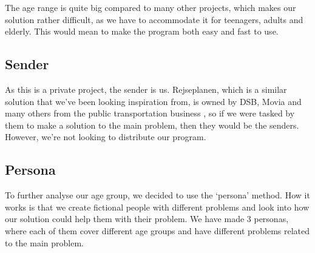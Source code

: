 The age range is quite big compared to many other projects, which makes our solution rather difficult, as we have to accommodate it for teenagers, adults and elderly. This would mean to make the program both easy and fast to use. 

\subsection{Sender} %

As this is a private project, the sender is us. Rejseplanen, which is a similar solution that we've been looking inspiration from, is owned by DSB, Movia and many others from the public transportation business \cite{om_rejseplanen}, so if we were tasked by them to make a solution to the main problem, then they would be the senders. However, we're not looking to distribute our program.

\subsection{Persona}

To further analyse our age group, we decided to use the `persona' method. How it works is that we create fictional people with different problems and look into how our solution could help them  with their problem. We have made 3 personas, where each of them cover different age groups and have different problems related to the main problem. 


